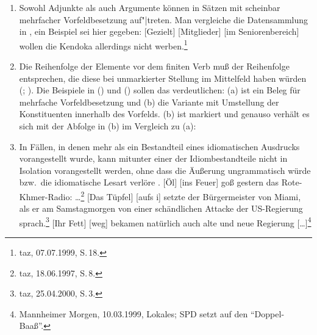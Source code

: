 \begin{enumerate}
\item Sowohl Adjunkte als auch Argumente können in Sätzen mit scheinbar mehrfacher Vorfeldbesetzung auf"|treten.
      Man vergleiche die Datensammlung in , ein Beispiel sei hier gegeben:
      \ea
      {}[Gezielt] [Mitglieder] [im Seniorenbereich] wollen die Kendoka allerdings nicht
      werben.\label{bsp-gezielt-mitglieder}\footnote{
        taz, 07.07.1999, S.\,18.
      }
      \z
\item Die Reihenfolge der Elemente vor dem finiten Verb muß der Reihenfolge entsprechen, 
      die diese bei unmarkierter Stellung im Mittelfeld haben würden 
      (\citealp[--413]{Eisenberg94a}; \citealp[Abschnitt~2.10]{Mueller2005d}).
      Die Beispiele in () und () sollen das verdeutlichen: (a) ist ein Beleg für mehrfache Vorfeldbesetzung
      und (b) die Variante mit Umstellung der Konstituenten innerhalb des Vorfelds.
\eal
{}
\zl
(b) ist markiert und genauso verhält es sich mit der Abfolge in (b) im Vergleich zu (a):
\eal{}
\zl
\item In Fällen, in denen mehr als ein Bestandteil eines idiomatischen Ausdrucks vorangestellt wurde,
      kann mitunter einer der Idiombestandteile nicht in Isolation vorangestellt werden, ohne dass die
      Äußerung ungrammatisch würde bzw.\ die idiomatische Lesart verlöre \citep[Abschnitt~2.9]{Mueller2005d}.
\eal
\ex {}[Öl] [ins Feuer] goß gestern das Rote-Khmer-Radio:
      \ldots\footnote{
        taz, 18.06.1997, S.\,8.
}
\ex{}
{}[Das Tüpfel] [aufs i] setzte der Bürgermeister von Miami, als er am Samstagmorgen von einer schändlichen 
Attacke der US-Regierung sprach.\footnote{
        taz, 25.04.2000, S.\,3. %
    }
\ex {}[Ihr Fett] [weg] bekamen natürlich auch alte und neue Regierung [\ldots]\footnote{
        Mannheimer Morgen, 10.03.1999, Lokales; SPD setzt auf den "`Doppel-Baaß"'. %
      }
\zl
\eal
{}
\zl
\end{enumerate}
